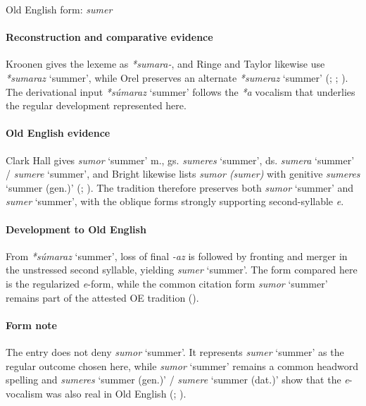 \documentclass[
  british,
  a4paper,
]{article}
\providecommand{\Recon}[1]{\emph{*#1}}
\begin{document}
Old English form: \emph{sumer}

\paragraph{Reconstruction and comparative
evidence}\label{reconstruction-and-comparative-evidence-59}

Kroonen gives the lexeme as \emph{*sumara-}, and Ringe and Taylor
likewise use \Recon{sumaraz} `summer', while Orel preserves an alternate
\Recon{sumeraz} `summer' (;
;
). The derivational input
\Recon{súmaraz} `summer' follows the \emph{*a} vocalism that underlies
the regular development represented here.

\paragraph{Old English evidence}\label{old-english-evidence-61}

Clark Hall gives {\emph{sumor}} `summer' m., gs. {\emph{sumeres}}
`summer', ds. {\emph{sumera}} `summer' / {\emph{sumere}} `summer', and
Bright likewise lists \emph{sumor (sumer)} with genitive
{\emph{sumeres}} `summer (gen.)' (; ).
The tradition therefore preserves both {\emph{sumor}} `summer' and
{\emph{sumer}} `summer', with the oblique forms strongly supporting
second-syllable \emph{e}.

\paragraph{Development to Old
English}\label{development-to-old-english-60}

From \Recon{súmaraz} `summer', loss of final \emph{-az} is followed by
fronting and merger in the unstressed second syllable, yielding
{\emph{sumer}} `summer'. The form compared here is the regularized
\emph{e}-form, while the common citation form {\emph{sumor}} `summer'
remains part of the attested OE tradition
().

\paragraph{Form note}\label{form-note-20}

The entry does not deny {\emph{sumor}} `summer'. It represents
{\emph{sumer}} `summer' as the regular outcome chosen here, while
{\emph{sumor}} `summer' remains a common headword spelling and
{\emph{sumeres}} `summer (gen.)' / {\emph{sumere}} `summer (dat.)' show
that the \emph{e}-vocalism was also real in Old English
(;
).
\end{document}
